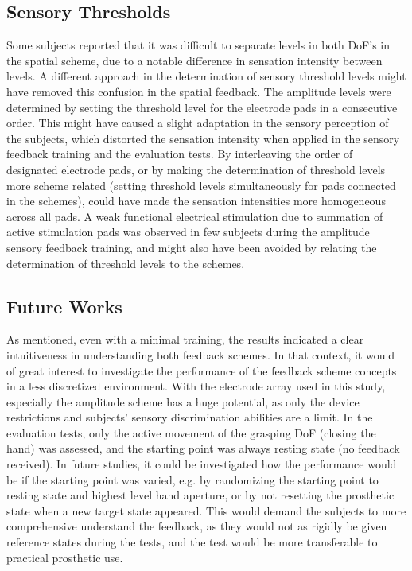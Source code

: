 \subsection{Sensory Thresholds}
Some subjects reported that it was difficult to separate levels in both DoF's in the spatial scheme, due to a notable difference in sensation intensity between levels. A different approach in the determination of sensory threshold levels might have removed this confusion in the spatial feedback. The amplitude levels were determined by setting the threshold level for the electrode pads in a consecutive order. This might have caused a slight adaptation in the sensory perception of the subjects, which distorted the sensation intensity when applied in the sensory feedback training and the evaluation tests. By interleaving the order of designated electrode pads, or by making the determination of threshold levels more scheme related (setting threshold levels simultaneously for pads connected in the schemes), could have made the sensation intensities more homogeneous across all pads. A weak functional electrical stimulation due to summation of active stimulation pads was observed in few subjects during the amplitude sensory feedback training, and might also have been avoided by relating the determination of threshold levels to the schemes. 

\subsection{Future Works}
As mentioned, even with a minimal training, the results indicated a clear intuitiveness in understanding both feedback schemes. In that context, it would of great interest to investigate the performance of the feedback scheme concepts in a less discretized environment. With the electrode array used in this study, especially the amplitude scheme has a huge potential, as only the device restrictions and subjects' sensory discrimination abilities are a limit.
In the evaluation tests, only the active movement of the grasping DoF (closing the hand) was assessed, and the starting point was always resting state (no feedback received). In future studies, it could be investigated how the performance would be if the starting point was varied, e.g. by randomizing the starting point to resting state and highest level hand aperture, or by not resetting the prosthetic state when a new target state appeared. This would demand the subjects to more comprehensive understand the feedback, as they would not as rigidly be given reference states during the tests, and the test would be more transferable to practical prosthetic use.

